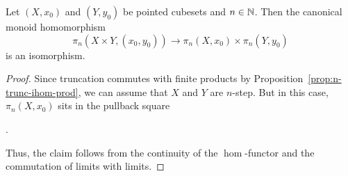 \begin{proposition}\label{prop:structure-monoid-prod}
Let $(X,x_0)$ and $(Y,y_0)$ be pointed cubesets and $n\in{\mathbb{N}}$.
Then the canonical monoid homomorphism
\[
    \pi_n(X\times Y,(x_0,y_0))\to\pi_n(X,x_0)\times\pi_n(Y,y_0)
\]
is an isomorphism.
\end{proposition}

\begin{proof}
Since truncation commutes with finite products by Proposition~\ref{prop:n-trunc-ihom-prod},
we can assume that $X$ and $Y$ are $n$-step.
But in this case, $\pi_n(X,x_0)$ sits in the pullback square
\begin{center}
.
\end{center}
Thus, the claim follows from the continuity of the $\hom$-functor and the commutation of limits with limits.
\end{proof}

